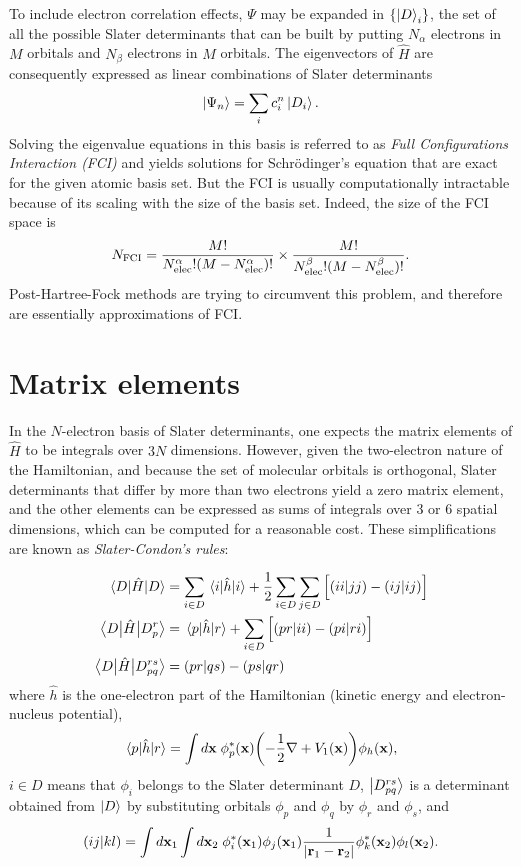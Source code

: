 \documentclass[./thesis.tex]{subfiles}
\begin{document}
To include electron correlation effects, $\Psi$ may be expanded in
$\{\ket D_i \}$, the set of all the possible Slater determinants that can be built by putting $N_\alpha$ electrons in $M$ orbitals and $N_\beta$ electrons in $M$ orbitals.
The eigenvectors of $\widehat{H}$ are consequently expressed as linear combinations of Slater determinants 
\begin{equation}
\ket{\Psi_n} = \sum_{i} c_i^n \ket{D_i}.
\end{equation}
Solving the eigenvalue equations in this basis is referred to as \emph{Full Configurations Interaction (FCI)} and yields solutions for Schrödinger's equation that are exact for the given atomic basis set.
But the FCI is usually computationally intractable because of its scaling with the size of the basis set. Indeed, the size of the FCI space is
\begin{equation}
N_\text{FCI} = \frac{M!}{{N_\text{elec}^\alpha} ! (M-{N_\text{elec}^\alpha})!} \times \frac{M!}{{N_\text{elec}^\beta} ! (M-{N_\text{elec}^\beta})!}.
\end{equation}
Post-Hartree-Fock methods are trying to circumvent this problem, and therefore
are essentially approximations of FCI.

\section{Matrix elements}
In the $N$-electron basis of Slater determinants, one expects the matrix elements of $\widehat H$ to be integrals over $3N$ dimensions.
However, given the two-electron nature of the Hamiltonian, and because the set of molecular orbitals is orthogonal, Slater determinants that differ by more than two electrons yield a zero matrix element, and the other elements can be expressed as sums of integrals over 3 or 6 spatial dimensions, which can be computed for a reasonable cost. These simplifications are known as \emph{Slater-Condon's rules}:

\begin{align}
\mel{D}{\hat{H}}{D} & = \sum_{i\in D} \mel{i}{\hat{h}}{i} + \frac{1}{2} \sum_{i\in D} \sum_{j\in D} \Big [ (ii|jj) - (ij|ij) \Big ]      \\
\mel{D}{\hat{H}}{D_p^r} & = \mel{p}{\hat{h}}{r} + \sum_{i\in D} \Big [ (pr|ii) - (pi|ri) \Big ]        \\
\mel{D}{\hat{H}}{D_{pq}^{rs}} & = (pr|qs) - (ps|qr)
\end{align}
where $\hat{h}$ is the one-electron part of the Hamiltonian (kinetic energy and
electron-nucleus potential),
\begin{equation}
\mel{p}{\hat{h}}{r} = \int d{\bf x}\; \phi^*_p(\mathbf{x}) \qty( -\frac{1}{2}\nabla + V_1(\mathbf{x})) \phi_h(\mathbf{x}),
\end{equation}
$i \in D$ means that $\phi_i$ belongs to the
Slater determinant $D$, $\ket {D_{pq}^{rs}}$ is a determinant obtained from $\ket
D$ by substituting orbitals $\phi_p$ and $\phi_q$ by $\phi_r$ and
$\phi_s$, and
\begin{equation}
(ij|kl) = \int d{\bf x}_1 \int d{\bf x}_2 \; \phi^*_i({\bf x}_1)\phi_j({\bf x}_1) \frac{1}{|{\bf r}_1 - {\bf r}_2|} \phi^*_k({\bf x}_2)\phi_l({\bf x}_2).
\end{equation}
\end{document}
